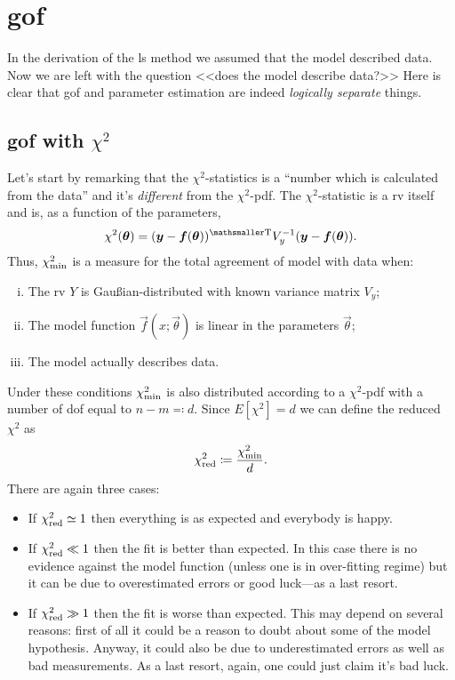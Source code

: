 \documentclass[
	10pt,
	draft
]{scrreprt}
\newcommand{\transpose}[1]{\ensuremath{#1}^{\mathrm{ \mathsmaller T}}}
\begin{document}
	\section{\acl{gof}}

In the derivation of the \ac{ls} method we assumed that the model described data.
Now we are left with the question <<does the model describe data?>>
Here is clear that \ac{gof} and parameter estimation are indeed \emph{logically separate} things.

		\subsection{\acl{gof} with $\chi^2$}

Let's start by remarking that the $\chi^2$-statistics is a ``number which is calculated from the data'' and it's \emph{different} from the $\chi^2$-\ac{pdf}.
The $\chi^2$-statistic is a \ac{rv} itself and is, as a function of the parameters,
\begin{equation}
\chi^2(\vec{\theta}) = \transpose{(\vec{y} - \vec{f}(\vec{\theta}))}V_y^{-1}(\vec{y} - \vec{f}(\vec{\theta})).
\end{equation}
Thus, $\chi^2_\textup{min}$ is a measure for the total  agreement of model with data when:
\begin{enumerate}[(i)]
	\item
The \ac{rv} $Y$ is Gau\ss{}ian-distributed with known variance matrix $V_y$;
	\item
The model function $\vec{f}(x;\vec{\theta})$ is linear in the parameters $\vec{\theta}$;
	\item
The model actually describes data.
\end{enumerate}
Under these conditions $\chi^2_\textup{min}$ is also distributed according to a $\chi^2$-\ac{pdf} with a number of \ac{dof} equal to $n-m\eqqcolon d$.
Since $E[\chi^2] = d$ we can define the reduced $\chi^2$ as
\begin{equation}
\chi^2_\textup{red} \coloneqq \frac{\chi^2_\textup{min}}{d}.
\end{equation}
There are again three cases:
\begin{itemize}
	\item
If $\chi^2_\textup{red} \simeq 1$ then everything is as expected and everybody is happy.
	\item
If $\chi^2_\textup{red} \ll 1$ then the fit is better than expected.
In this case there is no evidence against the model function (unless one is in over-fitting regime) but it can be due to overestimated errors or good luck---as a last resort.
	\item
If $\chi^2_\textup{red} \gg 1$ then the fit is worse than expected.
This may depend on several reasons: first of all it could be a reason to doubt about some of the model hypothesis.
Anyway, it could also be due  to underestimated errors as well as bad measurements.
As a last resort, again, one could just claim it's bad luck.
\end{itemize}
\end{document}
